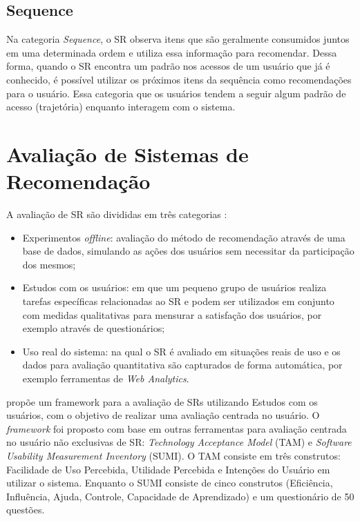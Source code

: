 \subsection{Sequence}

Na categoria \textit{Sequence}, o SR observa itens que são geralmente consumidos juntos em uma determinada ordem e utiliza essa
informação para recomendar. Dessa forma, quando o SR encontra um padrão nos acessos de um usuário que já é conhecido,
é possível utilizar os próximos itens da sequência como recomendações para o usuário. Essa categoria que os usuários
tendem a seguir algum padrão de acesso (trajetória) enquanto interagem com o sistema.

\section{Avaliação de Sistemas de Recomendação}

A avaliação de SR são divididas em três categorias \cite{shani2011evaluating}:

\begin{itemize}
\item Experimentos \textit{offline}: avaliação do método de recomendação através de uma base de dados, simulando as ações dos
usuários sem necessitar da participação dos mesmos;
\item Estudos com os usuários: em que um pequeno grupo de usuários realiza tarefas específicas relacionadas ao SR e
podem ser utilizados em conjunto com medidas qualitativas para mensurar a satisfação dos usuários, por exemplo através
de questionários;
\item Uso real do sistema: na qual o SR é avaliado em situações reais de uso e os dados para avaliação quantitativa são
capturados de forma automática, por exemplo ferramentas de \textit{Web Analytics}.
\end{itemize}

 propõe um framework para a avaliação de SRs utilizando Estudos com os usuários, com o objetivo
de realizar uma avaliação centrada no usuário. O \textit{framework} foi proposto com base em outras ferramentas para avaliação
centrada no usuário não exclusivas de SR: \textit{Technology Acceptance Model} (TAM) e \textit{Software Usability Measurement Inventory}
(SUMI). O TAM consiste em três construtos: Facilidade de Uso Percebida, Utilidade Percebida e Intenções do Usuário em
utilizar o sistema. Enquanto o SUMI consiste de cinco construtos (Eficiência, Influência, Ajuda, Controle, Capacidade
de Aprendizado) e um questionário de 50 questões.

